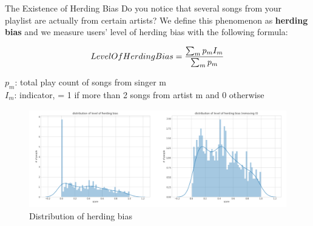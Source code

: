 \documentclass[final]{beamer}
\newlength{\onecolwid}
\newlength{\twocolwid}
\begin{document}
\begin{frame}
\begin{columns}[t]
\begin{column}{\twocolwid}




\begin{columns}[t,totalwidth=\twocolwid] %

\begin{column}{\onecolwid} %


\begin{exampleblock}{The Existence of Herding Bias}
Do you notice that several songs from your playlist are actually from certain artists? We define this phenomenon as \textbf{herding bias} and we measure users' level of herding bias with the following formula:

\vspace{-10mm}  
\begin{equation}
LevelOfHerdingBias = {{\sum_m{p_mI_m}}\over{\sum_m{p_m}}}
\label{eqn:Einstein}
\end{equation}

\vspace{-10mm}
$p_m$: total play count of songs from singer m \\ $I_m$: indicator, = 1 if more than 2 songs from artist m and 0 otherwise


\begin{figure}
\includegraphics[width=1\linewidth]{img/Q2_1.PNG}
\caption{Distribution of herding bias}
\end{figure}


\end{exampleblock}
\end{column}
\end{columns}
\end{column}
\end{columns}
\end{frame}
\end{document}
